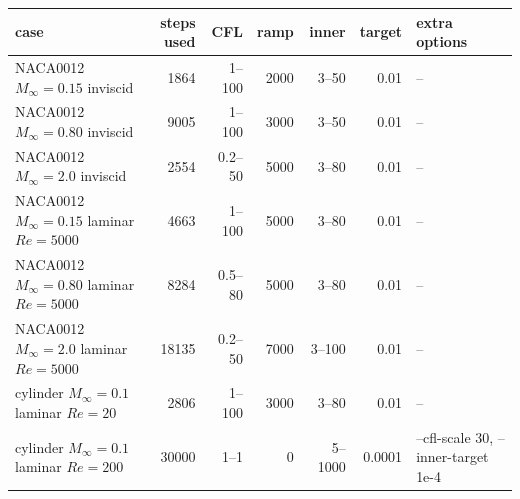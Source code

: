 \footnotesize
\begin{tabular}{lrrrrrl}
\toprule
case & steps used & CFL & ramp & inner & target & extra options\\
\midrule
NACA0012 $M_\infty=0.15$ inviscid & 1864 & 1--100 & 2000 & 3--50 & 0.01 & {\footnotesize --}\\
NACA0012 $M_\infty=0.80$ inviscid & 9005 & 1--100 & 3000 & 3--50 & 0.01 & {\footnotesize --}\\
NACA0012 $M_\infty=2.0$ inviscid & 2554 & 0.2--50 & 5000 & 3--80 & 0.01 & {\footnotesize --}\\
NACA0012 $M_\infty=0.15$ laminar $Re=5000$ & 4663 & 1--100 & 5000 & 3--80 & 0.01 & {\footnotesize --}\\
NACA0012 $M_\infty=0.80$ laminar $Re=5000$ & 8284 & 0.5--80 & 5000 & 3--80 & 0.01 & {\footnotesize --}\\
NACA0012 $M_\infty=2.0$ laminar $Re=5000$ & 18135 & 0.2--50 & 7000 & 3--100 & 0.01 & {\footnotesize --}\\
cylinder $M_\infty=0.1$ laminar $Re=20$ & 2806 & 1--100 & 3000 & 3--80 & 0.01 & {\footnotesize --}\\
cylinder $M_\infty=0.1$ laminar $Re=200$ & 30000 & 1--1 & 0 & 5--1000 & 0.0001 & {\footnotesize --cfl-scale 30, --inner-target 1e-4}\\
\bottomrule
\end{tabular}
